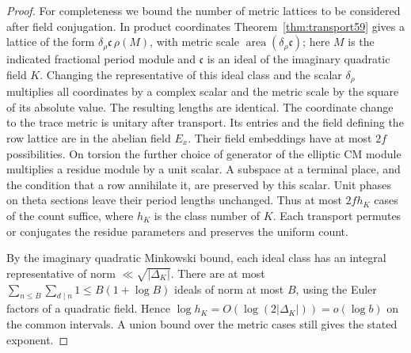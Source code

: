 \documentclass[a4paper,11pt]{article}
\theoremstyle{definition}
\theoremstyle{remark}
\numberwithin{equation}{section}
\begin{document}
\begin{proof}
For completeness we bound the number of metric lattices to
be considered after field conjugation. In product coordinates
Theorem~\ref{thm:transport59} gives a lattice of the form
\(\delta_\rho\mathfrak c\,\rho(M)\), with metric scale
\(\operatorname{area}(\delta_\rho\mathfrak c)\); here \(M\)
is the indicated fractional period module and \(\mathfrak c\)
is an ideal of the imaginary quadratic field \(K\). Changing
the representative of this ideal class and the scalar
\(\delta_\rho\) multiplies all coordinates by a complex
scalar and the metric scale by the square of its absolute
value. The resulting lengths are identical. The coordinate
change to the trace metric is unitary after transport. Its
entries and the field defining the row lattice are in the
abelian field \(E_x\). Their field embeddings have at most
\(2f\) possibilities. On torsion the further choice of
generator of the elliptic CM module multiplies a residue
module by a unit scalar. A subspace at a terminal place,
and the condition that a row annihilate it, are preserved
by this scalar. Unit phases on theta sections leave their
period lengths unchanged. Thus at most \(2f h_K\) cases of
the count suffice, where \(h_K\) is the class number of \(K\).
Each transport permutes or conjugates the residue parameters
and preserves the uniform count.

By the imaginary quadratic Minkowski bound, each ideal
class has an integral representative of norm
\(\ll\sqrt{|\Delta_K|}\). There are at most
\(\sum_{n\le B}\sum_{d\mid n}1\le B(1+\log B)\) ideals
of norm at most \(B\), using the Euler factors of a quadratic
field. Hence \(\log h_K=O(\log(2|\Delta_K|))=o(\log b)\)
on the common intervals. A union bound over the metric
cases still gives the stated exponent.
\end{proof}
\end{document}

